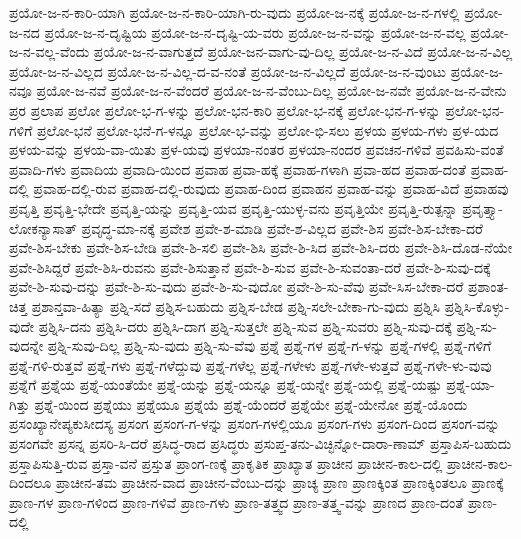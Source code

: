 {ಪ್ರಯೋ-ಜ-ನ-ಕಾರಿ-ಯಾಗಿ
ಪ್ರಯೋ-ಜ-ನ-ಕಾರಿ-ಯಾಗಿ-ರು-ವುದು
ಪ್ರಯೋ-ಜ-ನಕ್ಕೆ
ಪ್ರಯೋ-ಜ-ನ-ಗಳಲ್ಲಿ
ಪ್ರಯೋ-ಜ-ನದ
ಪ್ರಯೋ-ಜ-ನ-ದೃಷ್ಟಿಯ
ಪ್ರಯೋ-ಜ-ನ-ದೃಷ್ಟಿ-ಯ-ವರು
ಪ್ರಯೋ-ಜ-ನ-ವನ್ನು
ಪ್ರಯೋ-ಜ-ನ-ವಲ್ಲ
ಪ್ರಯೋ-ಜ-ನ-ವಲ್ಲ-ವೆಂದು
ಪ್ರಯೋ-ಜ-ನ-ವಾಗುತ್ತದೆ
ಪ್ರಯೋ-ಜನ-ವಾಗು-ವು-ದಿಲ್ಲ
ಪ್ರಯೋ-ಜ-ನ-ವಿದೆ
ಪ್ರಯೋ-ಜ-ನ-ವಿಲ್ಲ
ಪ್ರಯೋ-ಜ-ನ-ವಿಲ್ಲದ
ಪ್ರಯೋ-ಜ-ನ-ವಿಲ್ಲ-ದ-ವ-ನಂತೆ
ಪ್ರಯೋ-ಜ-ನ-ವಿಲ್ಲದೆ
ಪ್ರಯೋ-ಜ-ನ-ವುಂಟು
ಪ್ರಯೋ-ಜ-ನವೂ
ಪ್ರಯೋ-ಜ-ನವೆ
ಪ್ರಯೋ-ಜ-ನ-ವೆಂದರೆ
ಪ್ರಯೋ-ಜ-ನ-ವೆಂಬು-ದಿಲ್ಲ
ಪ್ರಯೋ-ಜ-ನವೇ
ಪ್ರಯೋ-ಜ-ನ-ವೇನು
ಪ್ರರ
ಪ್ರಲಾಪ
ಪ್ರಲೋ
ಪ್ರಲೋ-ಭ-ಗ-ಳನ್ನು
ಪ್ರಲೋ-ಭನ-ಕಾರಿ
ಪ್ರಲೋ-ಭ-ನಕ್ಕೆ
ಪ್ರಲೋ-ಭನ-ಗ-ಳನ್ನು
ಪ್ರಲೋ-ಭನ-ಗಳಿಗೆ
ಪ್ರಲೋ-ಭನೆ
ಪ್ರಲೋ-ಭನೆ-ಗ-ಳನ್ನೂ
ಪ್ರಲೋ-ಭ-ವನ್ನು
ಪ್ರಲೋ-ಭಿ-ಸಲು
ಪ್ರಳಯ
ಪ್ರಳಯ-ಗಳು
ಪ್ರಳ-ಯದ
ಪ್ರಳಯ-ವನ್ನು
ಪ್ರಳಯ-ವಾ-ಯಿತು
ಪ್ರಳ-ಯವು
ಪ್ರಳಯಾ-ನಂತರ
ಪ್ರಳಯಾ-ನಂದರ
ಪ್ರವಚನ-ಗಳಿವೆ
ಪ್ರವಹಿಸು-ವಂತೆ
ಪ್ರವಾದಿ-ಗಳು
ಪ್ರವಾದಿಯ
ಪ್ರವಾದಿ-ಯಿಂದ
ಪ್ರವಾಹ
ಪ್ರವಾ-ಹಕ್ಕೆ
ಪ್ರವಾಹ-ಗಳಾಗಿ
ಪ್ರವಾ-ಹದ
ಪ್ರವಾಹ-ದಂತೆ
ಪ್ರವಾಹ-ದಲ್ಲಿ
ಪ್ರವಾಹ-ದಲ್ಲಿ-ರುವ
ಪ್ರವಾಹ-ದಲ್ಲಿ-ರುವುದು
ಪ್ರವಾಹ-ದಿಂದ
ಪ್ರವಾಹನ
ಪ್ರವಾಹ-ವನ್ನು
ಪ್ರವಾಹ-ವಿದೆ
ಪ್ರವಾಹವು
ಪ್ರವೃತ್ತಿ
ಪ್ರವೃತ್ತಿ-ಭೇದೇ
ಪ್ರವೃತ್ತಿ-ಯನ್ನು
ಪ್ರವೃತ್ತಿ-ಯವ
ಪ್ರವೃತ್ತಿ-ಯುಳ್ಳ-ವನು
ಪ್ರವೃತ್ತಿಯೇ
ಪ್ರವೃತ್ತಿ-ರುತ್ಪನ್ನಾ
ಪ್ರವೃತ್ತ್ಯಾ-ಲೋಕನ್ಯಾಸಾತ್
ಪ್ರವೃದ್ಧ-ಮಾ-ನಕ್ಕೆ
ಪ್ರವೇಶ
ಪ್ರವೇ-ಶ-ಮಾಡಿ
ಪ್ರವೇ-ಶ-ವಿಲ್ಲದ
ಪ್ರವೇ-ಶಿಸ
ಪ್ರವೇ-ಶಿಸ-ಬೇಕಾ-ದರೆ
ಪ್ರವೇ-ಶಿಸ-ಬೇಕು
ಪ್ರವೇ-ಶಿಸ-ಬೇಡಿ
ಪ್ರವೇ-ಶಿ-ಸಲಿ
ಪ್ರವೇ-ಶಿಸಿ
ಪ್ರವೇ-ಶಿ-ಸಿದ
ಪ್ರವೇ-ಶಿಸಿ-ದರು
ಪ್ರವೇ-ಶಿಸಿ-ದೊಡ-ನೆಯೇ
ಪ್ರವೇ-ಶಿಸಿದ್ದರೆ
ಪ್ರವೇ-ಶಿಸಿ-ರುವನು
ಪ್ರವೇ-ಶಿಸುತ್ತಾನೆ
ಪ್ರವೇ-ಶಿ-ಸುವ
ಪ್ರವೇ-ಶಿ-ಸುವಂತಾ-ದರೆ
ಪ್ರವೇ-ಶಿ-ಸುವು-ದಕ್ಕೆ
ಪ್ರವೇ-ಶಿ-ಸುವು-ದನ್ನು
ಪ್ರವೇ-ಶಿ-ಸು-ವುದು
ಪ್ರವೇ-ಶಿ-ಸು-ವುದೋ
ಪ್ರವೇ-ಶಿ-ಸು-ವೆವು
ಪ್ರವೇ-ಸಿಸ-ಬೇಕಾ-ದರೆ
ಪ್ರಶಾಂತ-ಚಿತ್ತ
ಪ್ರಶಾನ್ತವಾ-ಹಿತ್ಯಾ
ಪ್ರಶ್ನಿ-ಸದೆ
ಪ್ರಶ್ನಿಸ-ಬಹುದು
ಪ್ರಶ್ನಿಸ-ಬೇಡ
ಪ್ರಶ್ನಿ-ಸಲೇ-ಬೇಕಾ-ಗು-ವುದು
ಪ್ರಶ್ನಿಸಿ
ಪ್ರಶ್ನಿಸಿ-ಕೊಳ್ಳು-ವುದೇ
ಪ್ರಶ್ನಿಸಿ-ದನು
ಪ್ರಶ್ನಿಸಿ-ದರು
ಪ್ರಶ್ನಿಸಿ-ದಾಗ
ಪ್ರಶ್ನಿ-ಸುತ್ತಲೇ
ಪ್ರಶ್ನಿ-ಸುವ
ಪ್ರಶ್ನಿ-ಸುವರು
ಪ್ರಶ್ನಿ-ಸುವು-ದಕ್ಕೆ
ಪ್ರಶ್ನಿ-ಸು-ವುದನ್ನೇ
ಪ್ರಶ್ನಿ-ಸುವು-ದಿಲ್ಲ
ಪ್ರಶ್ನಿ-ಸು-ವುದು
ಪ್ರಶ್ನಿ-ಸು-ವೆವು
ಪ್ರಶ್ನೆ
ಪ್ರಶ್ನೆ-ಗಳ
ಪ್ರಶ್ನೆ-ಗ-ಳನ್ನು
ಪ್ರಶ್ನೆ-ಗಳಲ್ಲಿ
ಪ್ರಶ್ನೆ-ಗಳಿಗೆ
ಪ್ರಶ್ನೆ-ಗಳಿ-ರುತ್ತವೆ
ಪ್ರಶ್ನೆ-ಗಳು
ಪ್ರಶ್ನೆ-ಗಳೆದ್ದುವು
ಪ್ರಶ್ನೆ-ಗಳೆಲ್ಲ
ಪ್ರಶ್ನೆ-ಗಳೇಳು
ಪ್ರಶ್ನೆ-ಗಳೇ-ಳುತ್ತವೆ
ಪ್ರಶ್ನೆ-ಗಳೇ-ಳು-ವುವು
ಪ್ರಶ್ನೆಗೆ
ಪ್ರಶ್ನೆಯ
ಪ್ರಶ್ನೆ-ಯಂತೆಯೇ
ಪ್ರಶ್ನೆ-ಯನ್ನು
ಪ್ರಶ್ನೆ-ಯನ್ನೂ
ಪ್ರಶ್ನೆ-ಯನ್ನೇ
ಪ್ರಶ್ನೆ-ಯಲ್ಲಿ
ಪ್ರಶ್ನೆ-ಯಷ್ಟು
ಪ್ರಶ್ನೆ-ಯಾ-ಗಿತ್ತು
ಪ್ರಶ್ನೆ-ಯಿಂದ
ಪ್ರಶ್ನೆಯು
ಪ್ರಶ್ನೆಯೂ
ಪ್ರಶ್ನೆಯೆ
ಪ್ರಶ್ನೆ-ಯೆಂದರೆ
ಪ್ರಶ್ನೆಯೇ
ಪ್ರಶ್ನೆ-ಯೇನೋ
ಪ್ರಶ್ನೆ-ಯೊಂದು
ಪ್ರಸಂಖ್ಯಾನೇಪ್ಯಕುಸೀದಸ್ಯ
ಪ್ರಸಂಗ
ಪ್ರಸಂಗ-ಗ-ಳನ್ನು
ಪ್ರಸಂಗ-ಗಳಲ್ಲಿಯೂ
ಪ್ರಸಂಗ-ಗಳು
ಪ್ರಸಂಗ-ದಿಂದ
ಪ್ರಸಂಗ-ವನ್ನು
ಪ್ರಸಂಗವೇ
ಪ್ರಸನ್ನ
ಪ್ರಸರಿ-ಸಿ-ದರೆ
ಪ್ರಸಿದ್ಧ-ರಾದ
ಪ್ರಸಿದ್ಧರು
ಪ್ರಸುಪ್ತ-ತನು-ವಿಚ್ಛಿನ್ನೋ-ದಾರಾ-ಣಾಮ್
ಪ್ರಸ್ತಾಪಿಸ-ಬಹುದು
ಪ್ರಸ್ತಾಪಿಸುತ್ತಿ-ರುವ
ಪ್ರಸ್ತಾ-ವನೆ
ಪ್ರಸ್ತುತ
ಪ್ರಾಂಗ-ಣಕ್ಕೆ
ಪ್ರಾಕೃತಿಕ
ಪ್ರಾಖ್ಯಾತ
ಪ್ರಾಚೀನ
ಪ್ರಾಚೀನ-ಕಾಲ-ದಲ್ಲಿ
ಪ್ರಾಚೀನ-ಕಾಲ-ದಿಂದಲೂ
ಪ್ರಾಚೀನ-ತಮ
ಪ್ರಾಚೀನ-ವಾದ
ಪ್ರಾಚೀನ-ವೆಂಬು-ದನ್ನು
ಪ್ರಾಚ್ಯ
ಪ್ರಾಣ
ಪ್ರಾಣಕ್ಕಿಂತ
ಪ್ರಾಣಕ್ಕಿಂತಲೂ
ಪ್ರಾಣಕ್ಕೆ
ಪ್ರಾಣ-ಗಳ
ಪ್ರಾಣ-ಗಳಿಂದ
ಪ್ರಾಣ-ಗಳಿವೆ
ಪ್ರಾಣ-ಗಳು
ಪ್ರಾಣ-ತತ್ತ್ವದ
ಪ್ರಾಣ-ತತ್ತ್ವ-ವನ್ನು
ಪ್ರಾಣದ
ಪ್ರಾಣ-ದಂತೆ
ಪ್ರಾಣ-ದಲ್ಲಿ
}
